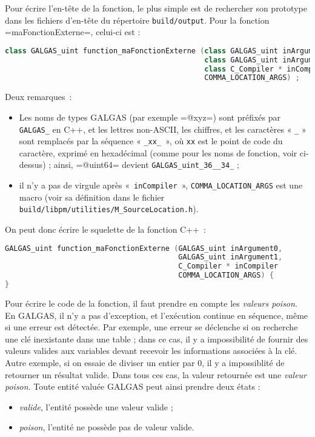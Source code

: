 Pour écrire l'en-tête de la fonction, le plus simple est de rechercher son prototype dans les fichiers d'en-tête du répertoire \texttt{build/output}. Pour la fonction \ggs=maFonctionExterne=, celui-ci est :

\begin{lstlisting}[language=C++]
class GALGAS_uint function_maFonctionExterne (class GALGAS_uint inArgument0,
                                              class GALGAS_uint inArgument1,
                                              class C_Compiler * inCompiler
                                              COMMA_LOCATION_ARGS) ;
\end{lstlisting}


Deux remarques~:
\begin{itemize}
  \item Les noms de types GALGAS (par exemple \ggs=@xyz=) sont préfixés par \texttt{GALGAS\_} en C++, et les lettres non-ASCII, les chiffres, et les caractères « \texttt{\_} »  sont remplacés par la séquence « \texttt{\_xx\_ }», où \texttt{xx} est le point de code du caractère, exprimé en hexadécimal (comme pour les noms de fonction, voir ci-dessus) ; ainsi, \ggs=@uint64= devient \texttt{GALGAS\_uint\_36\_\_34\_} ;
  \item il n'y a pas de virgule après «~\texttt{inCompiler}~», \texttt{COMMA\_LOCATION\_ARGS} est une macro (voir sa définition dans le fichier \texttt{build/libpm/utilities/M\_SourceLocation.h}).
\end{itemize}


On peut donc écrire le squelette de la fonction C++~:
\begin{lstlisting}[language=C++]
GALGAS_uint function_maFonctionExterne (GALGAS_uint inArgument0,
                                        GALGAS_uint inArgument1,
                                        C_Compiler * inCompiler
                                        COMMA_LOCATION_ARGS) {
}
\end{lstlisting}

Pour écrire le code de la fonction, il faut prendre en compte les \emph{valeurs poison}. En GALGAS, il n'y a pas d'exception, et l'exécution continue en séquence, même si une erreur est détectée. Par exemple, une erreur se déclenche si on recherche une clé inexistante dans une table ; dans ce cas, il y a impossibilité de fournir des valeurs valides aux variables devant recevoir les informations associées à la clé. Autre exemple, si on essaie de diviser un entier par $0$, il y a impossiblité de retourner un résultat valide. Dans tous ces cas, la valeur retournée est une \emph{valeur poison}. Toute entité valuée GALGAS peut ainsi prendre deux états :
\begin{itemize}
  \item \emph{valide}, l'entité possède une valeur valide ;
  \item \emph{poison}, l'entité ne possède pas de valeur valide.
\end{itemize}


